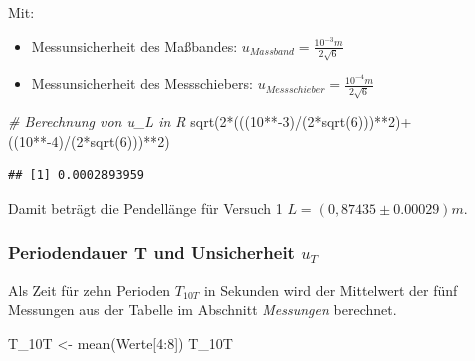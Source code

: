 \documentclass[
  9pt,
]{article}
\newenvironment{Shaded}{\begin{snugshade}}{\end{snugshade}}
\newcommand{\CommentTok}[1]{\textcolor[rgb]{0.56,0.35,0.01}{\textit{#1}}}
\newcommand{\DecValTok}[1]{\textcolor[rgb]{0.00,0.00,0.81}{#1}}
\newcommand{\FunctionTok}[1]{\textcolor[rgb]{0.00,0.00,0.00}{#1}}
\newcommand{\NormalTok}[1]{#1}
\newcommand{\OtherTok}[1]{\textcolor[rgb]{0.56,0.35,0.01}{#1}}
\newcommand{\SpecialCharTok}[1]{\textcolor[rgb]{0.00,0.00,0.00}{#1}}
\begin{document}
Mit:

\begin{itemize}
  \item Messunsicherheit des Maßbandes: $u_{Massband}=\frac{10^{-3}m}{2\sqrt{6}}$
  \item Messunsicherheit des Messschiebers: $u_{Messschieber}=\frac{10^{-4}m}{2\sqrt{6}}$
\end{itemize}

\begin{Shaded}
\begin{Highlighting}[]
\CommentTok{\# Berechnung von u\_L in R}
\FunctionTok{sqrt}\NormalTok{(}\DecValTok{2}\SpecialCharTok{*}\NormalTok{(((}\DecValTok{10}\SpecialCharTok{**{-}}\DecValTok{3}\NormalTok{)}\SpecialCharTok{/}\NormalTok{(}\DecValTok{2}\SpecialCharTok{*}\FunctionTok{sqrt}\NormalTok{(}\DecValTok{6}\NormalTok{)))}\SpecialCharTok{**}\DecValTok{2}\NormalTok{)}\SpecialCharTok{+}\NormalTok{((}\DecValTok{10}\SpecialCharTok{**{-}}\DecValTok{4}\NormalTok{)}\SpecialCharTok{/}\NormalTok{(}\DecValTok{2}\SpecialCharTok{*}\FunctionTok{sqrt}\NormalTok{(}\DecValTok{6}\NormalTok{)))}\SpecialCharTok{**}\DecValTok{2}\NormalTok{)}
\end{Highlighting}
\end{Shaded}

\begin{verbatim}
## [1] 0.0002893959
\end{verbatim}

Damit beträgt die Pendellänge für Versuch 1
\(L = (0,87435 \pm 0.00029)m\).

\hypertarget{periodendauer-t-und-unsicherheit-u_t}{%
\subsubsection{\texorpdfstring{Periodendauer T und Unsicherheit
\(u_T\)}{Periodendauer T und Unsicherheit u\_T}}\label{periodendauer-t-und-unsicherheit-u_t}}

Als Zeit für zehn Perioden \(T_{10T}\) in Sekunden wird der Mittelwert
der fünf Messungen aus der Tabelle im Abschnitt \textit{Messungen}
berechnet.

\begin{Shaded}
\begin{Highlighting}[]
\NormalTok{T\_10T }\OtherTok{\textless{}{-}} \FunctionTok{mean}\NormalTok{(Werte[}\DecValTok{4}\SpecialCharTok{:}\DecValTok{8}\NormalTok{])}
\NormalTok{T\_10T}
\end{Highlighting}
\end{Shaded}
\end{document}
